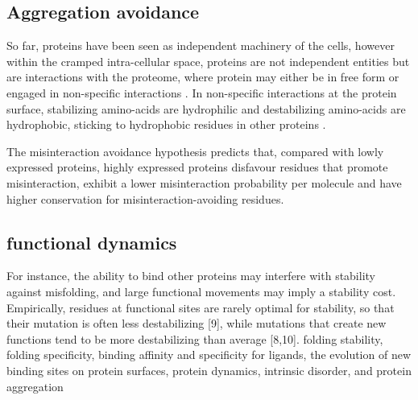 \subsection{Aggregation avoidance}

So far, proteins have been seen as independent machinery of the cells, however within the cramped intra-cellular space, proteins are not independent entities but are interactions with the proteome, where protein may either be in free form or engaged in non-specific interactions \citep{Yang2012, Zhang2013}.
In non-specific interactions at the protein surface, stabilizing amino-acids are hydrophilic and destabilizing amino-acids are hydrophobic, sticking to hydrophobic residues in other proteins \citep{Dixit2013,Manhart2015}.

The misinteraction avoidance hypothesis predicts that, compared with lowly expressed proteins, highly expressed proteins disfavour residues that promote misinteraction, exhibit a lower misinteraction probability per molecule and have higher conservation for misinteraction-avoiding residues.


\subsection{functional dynamics}

For instance, the ability to bind other proteins may interfere with stability against misfolding, and large functional movements may imply a stability cost.
Empirically, residues at functional sites are rarely optimal for stability, so that their mutation is often less destabilizing [9], while mutations that create new functions tend to be more destabilizing than average [8,10].
folding stability, folding specificity, binding affinity and specificity for ligands, the evolution of new binding sites on protein surfaces, protein dynamics, intrinsic disorder, and protein aggregation \citep{Chi2016}